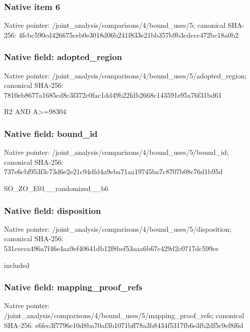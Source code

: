 \documentclass[10pt,a4paper]{article}
\begin{document}
\subsubsection{Native item 6}
Native pointer: /joint\_\allowbreak{}analysis/comparisons/4/bound\_\allowbreak{}uses/5; canonical SHA-256: 4fcbc590cd426675ceb0e3018d06b241f833e21bb357b9b3cdccc472bc18a0b2

\subsubsection{Native field: adopted\_\allowbreak{}region}
Native pointer: /joint\_\allowbreak{}analysis/comparisons/4/bound\_\allowbreak{}uses/5/adopted\_\allowbreak{}region; canonical SHA-256: 7810eb8677a1685cd8c3f372c0fac1dd49b22fdb2668c143591e95a76f31bd61

\begingroup\raggedright\sloppy R2 AND A>=\allowbreak{}98304\par\endgroup

\subsubsection{Native field: bound\_\allowbreak{}id}
Native pointer: /joint\_\allowbreak{}analysis/comparisons/4/bound\_\allowbreak{}uses/5/bound\_\allowbreak{}id; canonical SHA-256: 737e6cbf953f3c73d6e2e21c94dfd4a9eba71aa19745ba7c8707b08c76d1b95d

\begingroup\raggedright\sloppy SO\_\allowbreak{}ZO\_\allowbreak{}E01\_\allowbreak{}\_\allowbreak{}randomized\_\allowbreak{}\_\allowbreak{}b6\par\endgroup

\subsubsection{Native field: disposition}
Native pointer: /joint\_\allowbreak{}analysis/comparisons/4/bound\_\allowbreak{}uses/5/disposition; canonical SHA-256: 531cecca496a7f46e4aa9ef40641db12f8bef53aaa6b67c429d2c0717dc599ce

\begingroup\raggedright\sloppy included\par\endgroup

\subsubsection{Native field: mapping\_\allowbreak{}proof\_\allowbreak{}refs}
Native pointer: /joint\_\allowbreak{}analysis/comparisons/4/bound\_\allowbreak{}uses/5/mapping\_\allowbreak{}proof\_\allowbreak{}refs; canonical SHA-256: e6fec3f7796e10d8ba70af3b1071bff78a3b8434f5317fb6e3fb2df5c9ef8f6d
\end{document}
